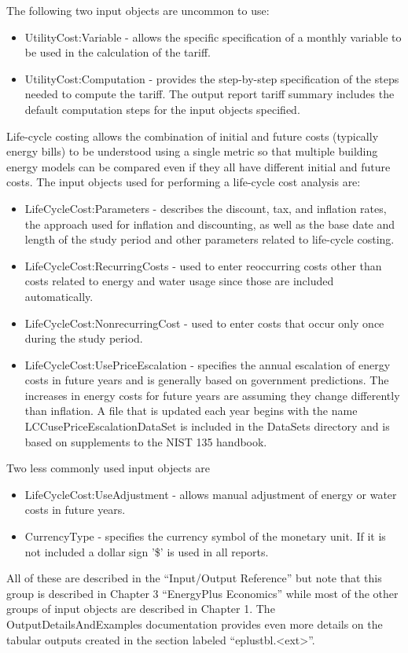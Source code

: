 The following two input objects are uncommon to use:
\begin{itemize}
\item UtilityCost:Variable - allows the specific specification of a monthly
variable to be used in the calculation of the tariff.
\item UtilityCost:Computation - provides the step-by-step specification
of the steps needed to compute the tariff. The output report tariff
summary includes the default computation steps for the input objects
specified. 
\end{itemize}
Life-cycle costing allows the combination of initial and future costs
(typically energy bills) to be understood using a single metric so
that multiple building energy models can be compared even if they
all have different initial and future costs. The input objects used
for performing a life-cycle cost analysis are:
\begin{itemize}
\item LifeCycleCost:Parameters - describes the discount, tax, and inflation
rates, the approach used for inflation and discounting, as well as
the base date and length of the study period and other parameters
related to life-cycle costing.
\item LifeCycleCost:RecurringCosts - used to enter reoccurring costs other
than costs related to energy and water usage since those are included
automatically.
\item LifeCycleCost:NonrecurringCost - used to enter costs that occur only
once during the study period.
\item LifeCycleCost:UsePriceEscalation - specifies the annual escalation
of energy costs in future years and is generally based on government
predictions. The increases in energy costs for future years are assuming
they change differently than inflation. A file that is updated each
year begins with the name LCCusePriceEscalationDataSet is included
in the DataSets directory and is based on supplements to the NIST
135 handbook.
\end{itemize}
Two less commonly used input objects are
\begin{itemize}
\item LifeCycleCost:UseAdjustment - allows manual adjustment of energy or
water costs in future years.
\item CurrencyType - specifies the currency symbol of the monetary unit.
If it is not included a dollar sign '\$' is used in all reports.
\end{itemize}
All of these are described in the \textquotedblleft Input/Output Reference\textquotedblright{}
but note that this group is described in Chapter 3 ``EnergyPlus Economics''
while most of the other groups of input objects are described in Chapter
1. The OutputDetailsAndExamples documentation provides even more details
on the tabular outputs created in the section labeled ``eplustbl.<ext>''. 

